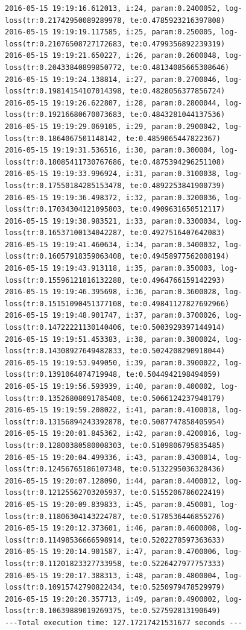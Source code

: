 \documentclass[11pt]{article}
\begin{document}
\begin{Verbatim}[commandchars=\\\{\}]
2016-05-15 19:19:16.612013, i:24, param:0.2400052, log-loss(tr:0.21742950089289978, te:0.4785923216397808)
2016-05-15 19:19:19.117585, i:25, param:0.250005, log-loss(tr:0.21076508727172683, te:0.4799356892239319)
2016-05-15 19:19:21.650227, i:26, param:0.2600048, log-loss(tr:0.20433840899850772, te:0.48134085665308646)
2016-05-15 19:19:24.138814, i:27, param:0.2700046, log-loss(tr:0.19814154107014398, te:0.4828056377856724)
2016-05-15 19:19:26.622807, i:28, param:0.2800044, log-loss(tr:0.19216680670073683, te:0.4843281044137536)
2016-05-15 19:19:29.069105, i:29, param:0.2900042, log-loss(tr:0.1864067501148142, te:0.4859065447822367)
2016-05-15 19:19:31.536516, i:30, param:0.300004, log-loss(tr:0.18085411730767686, te:0.4875394296251108)
2016-05-15 19:19:33.996924, i:31, param:0.3100038, log-loss(tr:0.17550184285153478, te:0.4892253841900739)
2016-05-15 19:19:36.498372, i:32, param:0.3200036, log-loss(tr:0.17034304121095803, te:0.4909631650512117)
2016-05-15 19:19:38.983521, i:33, param:0.3300034, log-loss(tr:0.16537100134042287, te:0.4927516407642083)
2016-05-15 19:19:41.460634, i:34, param:0.3400032, log-loss(tr:0.16057918359063408, te:0.49458977562008194)
2016-05-15 19:19:43.913118, i:35, param:0.350003, log-loss(tr:0.15596121816132288, te:0.4964766159142293)
2016-05-15 19:19:46.395698, i:36, param:0.3600028, log-loss(tr:0.15151090451377108, te:0.49841127827692966)
2016-05-15 19:19:48.901747, i:37, param:0.3700026, log-loss(tr:0.14722221130140406, te:0.5003929397144914)
2016-05-15 19:19:51.453383, i:38, param:0.3800024, log-loss(tr:0.14308927649482833, te:0.5024208290918044)
2016-05-15 19:19:53.949050, i:39, param:0.3900022, log-loss(tr:0.1391064074719948, te:0.5044942198494059)
2016-05-15 19:19:56.593939, i:40, param:0.400002, log-loss(tr:0.13526808091785408, te:0.5066124237948179)
2016-05-15 19:19:59.208022, i:41, param:0.4100018, log-loss(tr:0.13156894243392878, te:0.5087747858405954)
2016-05-15 19:20:01.845362, i:42, param:0.4200016, log-loss(tr:0.12800380580008303, te:0.5109806795835485)
2016-05-15 19:20:04.499336, i:43, param:0.4300014, log-loss(tr:0.12456765186107348, te:0.5132295036328436)
2016-05-15 19:20:07.128090, i:44, param:0.4400012, log-loss(tr:0.12125562703205937, te:0.5155206786022419)
2016-05-15 19:20:09.839833, i:45, param:0.450001, log-loss(tr:0.11806304143224787, te:0.5178536446855276)
2016-05-15 19:20:12.373601, i:46, param:0.4600008, log-loss(tr:0.11498536666598914, te:0.5202278597363633)
2016-05-15 19:20:14.901587, i:47, param:0.4700006, log-loss(tr:0.11201823327733958, te:0.5226427977757333)
2016-05-15 19:20:17.388313, i:48, param:0.4800004, log-loss(tr:0.10915742790822434, te:0.5250979478529979)
2016-05-15 19:20:20.357713, i:49, param:0.4900002, log-loss(tr:0.10639889019269375, te:0.527592813190649)
---Total execution time: 127.17217421531677 seconds ---

    \end{Verbatim}
\end{document}
